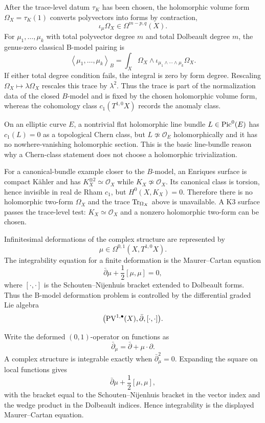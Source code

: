 After the trace-level datum \(\tau_K\) has been chosen, the holomorphic
volume form \(\Omega_X=\tau_K(1)\) converts polyvectors into forms by
contraction,
\[
  \iota_\mu\Omega_X\in \Omega^{m-p,q}(X).
\]
For \(\mu_1,\ldots,\mu_k\) with total polyvector degree \(m\) and total
Dolbeault degree \(m\), the genus-zero classical B-model pairing is
\[
  \left\langle \mu_1,\ldots,\mu_k\right\rangle_B
  =
  \int_X
  \Omega_X\wedge
  \iota_{\mu_1\wedge\cdots\wedge\mu_k}\Omega_X .
\]
If either total degree condition fails, the integral is zero by form degree.
Rescaling \(\Omega_X\mapsto\lambda\Omega_X\) rescales this trace by
\(\lambda^2\).  Thus the trace is part of the normalization data of the
closed \(B\)-model and is fixed by the chosen holomorphic volume form, whereas
the cohomology class \(c_1(T^{1,0}X)\) records the anomaly class.

\begin{example}
\label{ex:bmodel-c1-volume-form-separation}
On an elliptic curve \(E\), a nontrivial flat holomorphic line bundle
\(L\in{\rm Pic}^0(E)\) has \(c_1(L)=0\) as a topological Chern class, but
\(L\not\simeq\mathcal O_E\) holomorphically and it has no nowhere-vanishing
holomorphic section.  This is the basic line-bundle reason why a Chern-class
statement does not choose a holomorphic trivialization.

For a canonical-bundle example closer to the \(B\)-model, an Enriques surface
is compact K\"ahler and has \(K_X^{\otimes2}\simeq\mathcal O_X\) while
\(K_X\not\simeq\mathcal O_X\).  Its canonical class is torsion, hence
invisible in real de Rham \(c_1\), but \(H^0(X,K_X)=0\).  Therefore there is
no holomorphic two-form \(\Omega_X\) and the trace
\({\rm Tr}_{\Omega_X}\) above is unavailable.  A K3 surface passes the
trace-level test: \(K_X\simeq\mathcal O_X\) and a nonzero holomorphic
two-form can be chosen.
\end{example}

\begin{remark}
Infinitesimal deformations of the complex structure are represented by
\[
  \mu\in \Omega^{0,1}(X,T^{1,0}X).
\]
The integrability equation for a finite deformation is the
Maurer--Cartan equation
\[
  \bar\partial\mu+\frac12[\mu,\mu]=0,
\]
where \([\cdot,\cdot]\) is the Schouten--Nijenhuis bracket extended to
Dolbeault forms.  Thus the B-model deformation problem is controlled by the
differential graded Lie algebra
\[
  \bigl({\rm PV}^{1,\bullet}(X),\bar\partial,[\cdot,\cdot]\bigr).
\]

Write the deformed \((0,1)\)-operator on functions as
\[
  \bar\partial_\mu=\bar\partial+\mu\cdot\partial .
\]
A complex structure is integrable exactly when
\(\bar\partial_\mu^2=0\).  Expanding the square on local functions gives
\[
  \bar\partial\mu+\frac12[\mu,\mu],
\]
with the bracket equal to the Schouten--Nijenhuis bracket in the vector index
and the wedge product in the Dolbeault indices.  Hence integrability is the
displayed Maurer--Cartan equation.
\end{remark}

